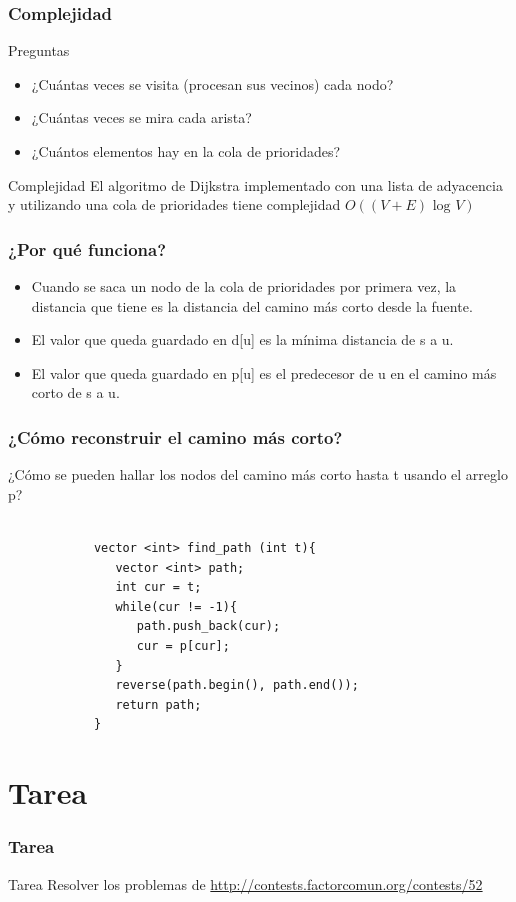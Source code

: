 \documentclass{beamer}
\begin{document}
	\begin{frame}
		\frametitle{Complejidad}
		\begin{alertblock}{Preguntas}
			\begin{itemize}
				\item ¿Cuántas veces se visita (procesan sus vecinos) cada nodo?
				\item ¿Cuántas veces se mira cada arista?
				\item ¿Cuántos elementos hay en la cola de prioridades?
			\end{itemize}
		\end{alertblock}
		\pause
		\begin{block}{Complejidad}
			El algoritmo de Dijkstra implementado con una lista de adyacencia y utilizando una cola de prioridades tiene complejidad $O((V+E) \text{ log } V)$
		\end{block}
	\end{frame}
	
	\begin{frame}
		\frametitle{¿Por qué funciona?}
		\begin{itemize}
			\item Cuando se saca un nodo de la cola de prioridades por primera vez, la distancia que tiene es la distancia del camino más corto desde la fuente.
			\item El valor que queda guardado en d[u] es la mínima distancia de s a u.
			\item El valor que queda guardado en p[u] es el predecesor de u en el camino más corto de s a u.
		\end{itemize}
	\end{frame}
	
	\begin{frame}[fragile]
		\frametitle{¿Cómo reconstruir el camino más corto?}
		¿Cómo se pueden hallar los nodos del camino más corto hasta t usando el arreglo p? \\ \quad \\
		\pause
		\begin{lstlisting}
			vector <int> find_path (int t){
			   vector <int> path;
			   int cur = t;
			   while(cur != -1){
			      path.push_back(cur);
			      cur = p[cur];
			   }
			   reverse(path.begin(), path.end());
			   return path;
			}
		\end{lstlisting}
	\end{frame}

\section{Tarea}
	\begin{frame}
		\frametitle{Tarea}
		\begin{alertblock}{Tarea}
			Resolver los problemas de \url{http://contests.factorcomun.org/contests/52}
		\end{alertblock}
	\end{frame}
\end{document}
